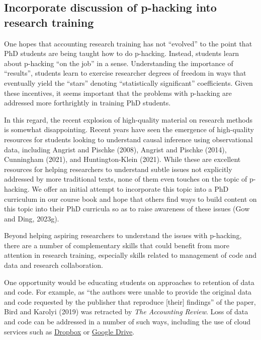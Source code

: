 \documentclass[
  letterpaper,
  DIV=11,
  numbers=noendperiod]{scrartcl}
\begin{document}
\hypertarget{incorporate-discussion-of-p-hacking-into-research-training}{%
\subsection{Incorporate discussion of p-hacking into research
training}\label{incorporate-discussion-of-p-hacking-into-research-training}}

One hopes that accounting research training has not ``evolved'' to the
point that PhD students are being taught how to do p-hacking. Instead,
students learn about p-hacking ``on the job'' in a sense. Understanding
the importance of ``results'', students learn to exercise researcher
degrees of freedom in ways that eventually yield the ``stars'' denoting
``statistically significant'' coefficients. Given these incentives, it
seems important that the problems with p-hacking are addressed more
forthrightly in training PhD students.

In this regard, the recent explosion of high-quality material on
research methods is somewhat disappointing. Recent years have seen the
emergence of high-quality resources for students looking to understand
causal inference using observational data, including Angrist and Pischke
(2008), Angrist and Pischke (2014), Cunningham (2021), and
Huntington-Klein (2021). While these are excellent resources for helping
researchers to understand subtle issues not explicitly addressed by more
traditional texts, none of them even touches on the topic of p-hacking.
We offer an initial attempt to incorporate this topic into a PhD
curriculum in our course book and hope that others find ways to build
content on this topic into their PhD curricula so as to raise awareness
of these issues (Gow and Ding, 2023g).

Beyond helping aspiring researchers to understand the issues with
p-hacking, there are a number of complementary skills that could benefit
from more attention in research training, especially skills related to
management of code and data and research collaboration.

One opportunity would be educating students on approaches to retention
of data and code. For example, as ``the authors were unable to provide
the original data and code requested by the publisher that reproduce
{[}their{]} findings'' of the paper, Bird and Karolyi (2019) was
retracted by \emph{The Accounting Review}. Loss of data and code can be
addressed in a number of such ways, including the use of cloud services
such as \href{https://www.dropbox.com}{Dropbox} or
\href{https://drive.google.com}{Google Drive}.
\end{document}
